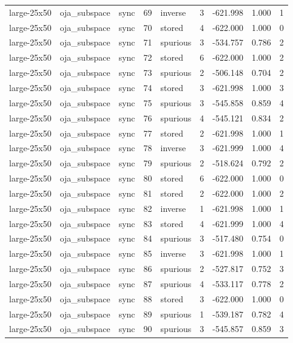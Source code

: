 \begin{tabular}{lllrlrrrr}
large-25x50 & oja\_subspace & sync & 69 & inverse & 3 & -621.998 & 1.000 & 1 \\
large-25x50 & oja\_subspace & sync & 70 & stored & 4 & -622.000 & 1.000 & 0 \\
large-25x50 & oja\_subspace & sync & 71 & spurious & 3 & -534.757 & 0.786 & 2 \\
large-25x50 & oja\_subspace & sync & 72 & stored & 6 & -622.000 & 1.000 & 2 \\
large-25x50 & oja\_subspace & sync & 73 & spurious & 2 & -506.148 & 0.704 & 2 \\
large-25x50 & oja\_subspace & sync & 74 & stored & 3 & -621.998 & 1.000 & 3 \\
large-25x50 & oja\_subspace & sync & 75 & spurious & 3 & -545.858 & 0.859 & 4 \\
large-25x50 & oja\_subspace & sync & 76 & spurious & 4 & -545.121 & 0.834 & 2 \\
large-25x50 & oja\_subspace & sync & 77 & stored & 2 & -621.998 & 1.000 & 1 \\
large-25x50 & oja\_subspace & sync & 78 & inverse & 3 & -621.999 & 1.000 & 4 \\
large-25x50 & oja\_subspace & sync & 79 & spurious & 2 & -518.624 & 0.792 & 2 \\
large-25x50 & oja\_subspace & sync & 80 & stored & 6 & -622.000 & 1.000 & 0 \\
large-25x50 & oja\_subspace & sync & 81 & stored & 2 & -622.000 & 1.000 & 2 \\
large-25x50 & oja\_subspace & sync & 82 & inverse & 1 & -621.998 & 1.000 & 1 \\
large-25x50 & oja\_subspace & sync & 83 & stored & 4 & -621.999 & 1.000 & 4 \\
large-25x50 & oja\_subspace & sync & 84 & spurious & 3 & -517.480 & 0.754 & 0 \\
large-25x50 & oja\_subspace & sync & 85 & inverse & 3 & -621.998 & 1.000 & 1 \\
large-25x50 & oja\_subspace & sync & 86 & spurious & 2 & -527.817 & 0.752 & 3 \\
large-25x50 & oja\_subspace & sync & 87 & spurious & 4 & -533.117 & 0.778 & 2 \\
large-25x50 & oja\_subspace & sync & 88 & stored & 3 & -622.000 & 1.000 & 0 \\
large-25x50 & oja\_subspace & sync & 89 & spurious & 1 & -539.187 & 0.782 & 4 \\
large-25x50 & oja\_subspace & sync & 90 & spurious & 3 & -545.857 & 0.859 & 3 \\

\end{tabular}
